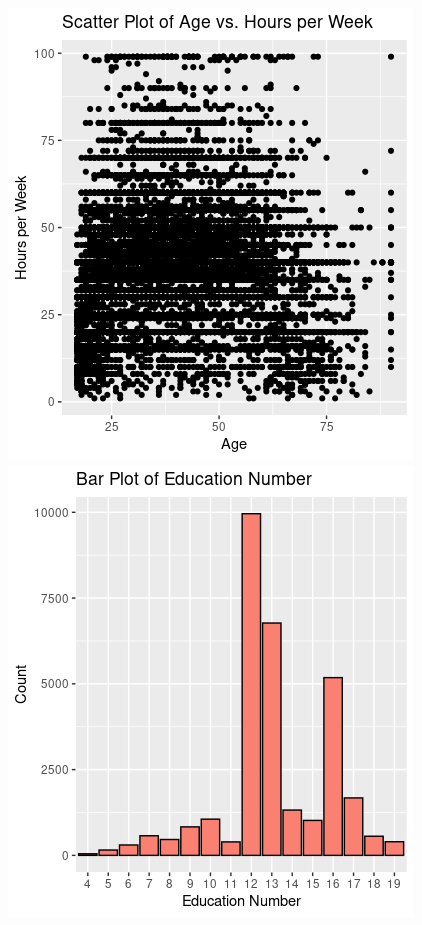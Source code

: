 \documentclass{article}
\begin{document}
\begin{center}
    \includegraphics[scale = 0.6]{age_hpw.png} \includegraphics[scale = 0.6]{edu_barplot.png}


\end{center}
\end{document}
